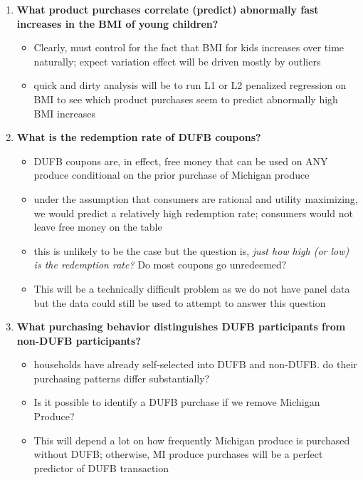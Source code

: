 \documentclass[11pt,letterpaper,]{book}
\providecommand{\tightlist}{%
  \setlength{\itemsep}{0pt}\setlength{\parskip}{0pt}}
\begin{document}
\begin{enumerate}
\def\labelenumi{\arabic{enumi}.}
\tightlist
\item
  \textbf{What product purchases correlate (predict) abnormally fast
  increases in the BMI of young children?}

  \begin{itemize}
  \tightlist
  \item
    Clearly, must control for the fact that BMI for kids increases over
    time naturally; expect variation effect will be driven mostly by
    outliers
  \item
    quick and dirty analysis will be to run L1 or L2 penalized
    regression on BMI to see which product purchases seem to predict
    abnormally high BMI increases
  \end{itemize}
\item
  \textbf{What is the redemption rate of DUFB coupons?}

  \begin{itemize}
  \tightlist
  \item
    DUFB coupons are, in effect, free money that can be used on ANY
    produce conditional on the prior purchase of Michigan produce
  \item
    under the assumption that consumers are rational and utility
    maximizing, we would predict a relatively high redemption rate;
    consumers would not leave free money on the table
  \item
    this is unlikely to be the case but the question is, \emph{just how
    high (or low) is the redemption rate?} Do most coupons go
    unredeemed?
  \item
    This will be a technically difficult problem as we do not have panel
    data but the data could still be used to attempt to answer this
    question
  \end{itemize}
\item
  \textbf{What purchasing behavior distinguishes DUFB participants from
  non-DUFB participants?}

  \begin{itemize}
  \tightlist
  \item
    households have already self-selected into DUFB and non-DUFB. do
    their purchasing patterns differ substantially?
  \item
    Is it possible to identify a DUFB purchase if we remove Michigan
    Produce?
  \item
    This will depend a lot on how frequently Michigan produce is
    purchased without DUFB; otherwise, MI produce purchases will be a
    perfect predictor of DUFB transaction
  \end{itemize}
\end{enumerate}
\end{document}
